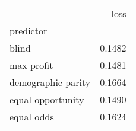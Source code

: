 \begin{tabular}{lr}
\toprule
{} &   loss \\
predictor          &        \\
\midrule
blind              & 0.1482 \\
max profit         & 0.1481 \\
demographic parity & 0.1664 \\
equal opportunity  & 0.1490 \\
equal odds         & 0.1624 \\
\bottomrule
\end{tabular}

